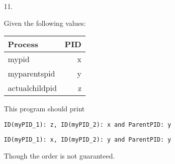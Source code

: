 \documentclass[12pt,letterpaper]{article}
\begin{document}
\begin{enumerate}
    \item [11.]

      Given the following values:

      \begin{tabular}{l | r |}
        Process & PID \\
        \hline
        mypid          & x \\
        myparentspid   & y \\
        actualchildpid & z \\
        \hline
      \end{tabular}

      This program should print

      \texttt{ID(myPID\_1): z, ID(myPID\_2): x and ParentPID: y}

      \texttt{ID(myPID\_1): x, ID(myPID\_2): y and ParentPID: y}

      Though the order is not guaranteed.
  \end{enumerate}
\end{document}

